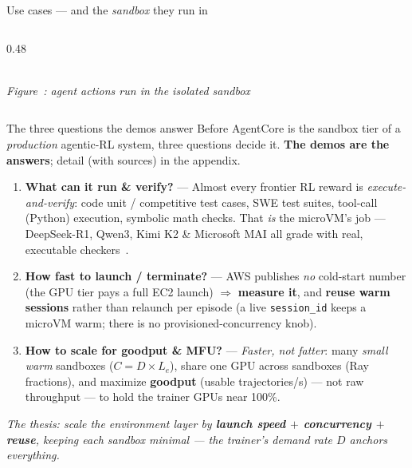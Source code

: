 \documentclass[aspectratio=169]{beamer}
\newcounter{deckfig}
\newcommand{\figtag}[1]{\refstepcounter{deckfig}%
  {\scriptsize\itshape Figure~\thedeckfig: #1}}
\begin{document}
\begin{frame}{Use cases --- and the \emph{sandbox} they run in}
\begin{columns}[T]
\begin{column}{0.48\textwidth}
      \centering
      \\[0.05em]\figtag{agent actions run in the isolated sandbox}
    \end{column}
  \end{columns}
\end{frame}

\begin{frame}{The three questions the demos answer}
  \footnotesize Before AgentCore is the sandbox tier of a \emph{production} agentic-RL system, three
  questions decide it. \textbf{The demos are the answers}; detail (with sources) in the appendix.
  \vspace{0.3em}
  \begin{enumerate}\setlength\itemsep{0.55em}
    \item[\textbf{1}] \textbf{What can it run \& verify?} --- Almost every frontier RL reward is
      \emph{execute-and-verify}: code unit / competitive test cases, SWE test suites, tool-call (Python)
      execution, symbolic math checks. That \emph{is} the microVM's job --- DeepSeek-R1, Qwen3, Kimi K2
      \& Microsoft MAI all grade with real, executable checkers~\cite{deepseekr1,qwen3,kimik2}.
    \item[\textbf{2}] \textbf{How fast to launch / terminate?} --- AWS publishes \emph{no} cold-start
      number (the GPU tier pays a full EC2 launch) $\Rightarrow$ \textbf{measure it}, and \textbf{reuse
      warm sessions} rather than relaunch per episode (a live \texttt{session\_id} keeps a microVM warm;
      there is no provisioned-concurrency knob).
    \item[\textbf{3}] \textbf{How to scale for goodput \& MFU?} --- \emph{Faster, not fatter}: many
      \emph{small warm} sandboxes ($C = D \times L_e$), share one GPU across sandboxes (Ray fractions),
      and maximize \textbf{goodput} (usable trajectories/s) --- not raw throughput --- to hold the
      trainer GPUs near 100\%.
  \end{enumerate}
  \vspace{0.2em}
  {\scriptsize\itshape The thesis: scale the environment layer by \textbf{launch speed $+$ concurrency
  $+$ reuse}, keeping each sandbox minimal --- the trainer's demand rate $D$ anchors everything.}
\end{frame}
\end{document}
